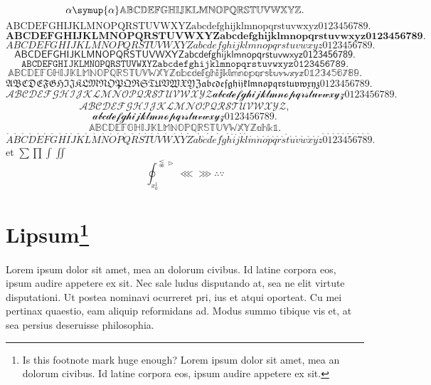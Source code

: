 \documentclass[twoside, 10pt]{article}
\begin{document}
        \[
            \alpha \symup{\alpha} \mathbb{A} \mathbb{B} \mathbb{C} \mathbb{D} \mathbb{E} \mathbb{F} \mathbb{G} \mathbb{H} \mathbb{I} \mathbb{J} \mathbb{K}%
        \mathbb{L} \mathbb{M} \mathbb{N} \mathbb{O} \mathbb{P} \mathbb{Q} \mathbb{R} \mathbb{S} \mathbb{T} \mathbb{U} \mathbb{V} \mathbb{W} \mathbb{X}%
        \mathbb{Y} \mathbb{Z} 
        .\]
        \[
            \mathrm{ABCDEFGHIJKLMNOPQRSTUVWXYZabcdefghijklmnopqrstuvwxyz0123456789}
        .\]
        \[
            \mathbf{ABCDEFGHIJKLMNOPQRSTUVWXYZabcdefghijklmnopqrstuvwxyz0123456789}
        .\]
        \[
            \mathit{ABCDEFGHIJKLMNOPQRSTUVWXYZabcdefghijklmnopqrstuvwxyz0123456789}
        .\]
        \[
            \mathsf{ABCDEFGHIJKLMNOPQRSTUVWXYZabcdefghijklmnopqrstuvwxyz0123456789}
        .\]
        \[
            \mathtt{ABCDEFGHIJKLMNOPQRSTUVWXYZabcdefghijklmnopqrstuvwxyz0123456789}
        .\]
        \[
            \mathbb{ABCDEFGHIJKLMNOPQRSTUVWXYZabcdefghijklmnopqrstuvwxyz0123456789}
        .\]
        \[
            \mathfrak{ABCDEFGHIJKLMNOPQRSTUVWXYZabcdefghijklmnopqrstuvwxyz0123456789}
        .\]
        \[
            \mathcal{ABCDEFGHIJKLMNOPQRSTUVWXYZabcdefghijklmnopqrstuvwxyz0123456789}
        .\]
        \[
            \mathscr{ABCDEFGHIJKLMNOPQRSTUVWXYZ}
        ,\]
        \[
            \mathscr{abcdefghijklmnopqrstuvwxyz0123456789}
        .\]
        \[
            \mathds{ABCDEFGHIJKLMNOPQRSTUVWXYZahk1}
        .\]%
        \[
            \mathring{A}\mathring{B}\mathring{C}\mathring{D}\mathring{E}\mathring{F}\mathring{G}\mathring{H}\mathring{I}
            \mathring{J}\mathring{K}\mathring{L}\mathring{M}\mathring{N}\mathring{O}\mathring{P}\mathring{Q}\mathring{R}
            \mathring{S}\mathring{T}\mathring{U}\mathring{V}\mathring{W}\mathring{X}\mathring{Y}\mathring{Z}\mathring{a}
            \mathring{b}\mathring{c}\mathring{d}\mathring{e}\mathring{f}\mathring{g}\mathring{h}\mathring{i}\mathring{j}
            \mathring{k}\mathring{l}\mathring{m}\mathring{n}\mathring{o}\mathring{p}\mathring{q}\mathring{r}\mathring{s}
            \mathring{t}\mathring{u}\mathring{v}\mathring{w}\mathring{x}\mathring{y}\mathring{z}\mathring{0}\mathring{1}
            \mathring{2}\mathring{3}\mathring{4}\mathring{5}\mathring{6}\mathring{7}\mathring{8}\mathring{9}
        .\]
         et 
        \(\sum \prod \int \iint \)
        \[\oint_{x_0^1}^{\lnapprox \vartriangleright}\lll \ggg \therefore \because  \]

    \section{Lipsum\texorpdfstring{\footnote[99]{Is this footnote mark huge enough? 
    Lorem ipsum dolor sit amet, mea an dolorum civibus. Id latine corpora eos, ipsum audire appetere ex sit.}}{}}
    \label{sec3}
    Lorem ipsum dolor sit amet, mea an dolorum civibus. Id latine corpora eos, ipsum audire appetere ex sit. 
    Nec sale ludus disputando at, sea ne elit virtute disputationi. Ut postea nominavi ocurreret pri, ius et atqui oporteat. 
    Cu mei pertinax quaestio, eam aliquip reformidans ad. Modus summo tibique vis et, at sea persius deseruisse philosophia.
\end{document}
